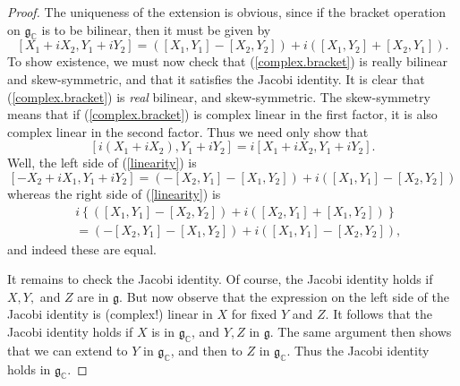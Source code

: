 \documentclass{amsbook}
\let \frak = \mathfrak
\theoremstyle{plain}
\numberwithin{equation}{chapter}
\numberwithin{theorem}{chapter}
\begin{document}
\begin{proof}
The uniqueness of the extension is obvious, since if the bracket operation on
$\frak{g}_{\mathbb{C}}$ is to be bilinear, then it must be given by
\begin{equation}
\left[  X_{1}+iX_{2},Y_{1}+iY_{2}\right]  =\left(  \left[  X_{1},Y_{1}\right]
-\left[  X_{2},Y_{2}\right]  \right)  +i\left(  \left[  X_{1},Y_{2}\right]
+\left[  X_{2},Y_{1}\right]  \right)  \text{.}\label{complex.bracket}%
\end{equation}
To show existence, we must now check that (\ref{complex.bracket}) is really
bilinear and skew-symmetric, and that it satisfies the Jacobi identity. It is
clear that (\ref{complex.bracket}) is \textit{real} bilinear, and
skew-symmetric. The skew-symmetry means that if (\ref{complex.bracket}) is
complex linear in the first factor, it is also complex linear in the second
factor. Thus we need only show that
\begin{equation}
\left[  i(X_{1}+iX_{2}),Y_{1}+iY_{2}\right]  =i\left[  X_{1}+iX_{2}%
,Y_{1}+iY_{2}\right]  \text{.}\label{linearity}%
\end{equation}
Well, the left side of (\ref{linearity}) is
\[
\left[  -X_{2}+iX_{1},Y_{1}+iY_{2}\right]  =\left(  -\left[  X_{2}%
,Y_{1}\right]  -\left[  X_{1},Y_{2}\right]  \right)  +i\left(  \left[
X_{1},Y_{1}\right]  -\left[  X_{2},Y_{2}\right]  \right)
\]
whereas the right side of (\ref{linearity}) is
\begin{align*}
& i\left\{  \left(  \left[  X_{1},Y_{1}\right]  -\left[  X_{2},Y_{2}\right]
\right)  +i\left(  \left[  X_{2},Y_{1}\right]  +\left[  X_{1},Y_{2}\right]
\right)  \right\}  \\
& =\left(  -\left[  X_{2},Y_{1}\right]  -\left[  X_{1},Y_{2}\right]  \right)
+i\left(  \left[  X_{1},Y_{1}\right]  -\left[  X_{2},Y_{2}\right]  \right)
\text{,}%
\end{align*}
and indeed these are equal.

It remains to check the Jacobi identity. Of course, the Jacobi identity holds
if $X,Y,$ and $Z$ are in $\frak{g}$. But now observe that the expression on
the left side of the Jacobi identity is (complex!) linear in $X$ for fixed $Y$
and $Z$. It follows that the Jacobi identity holds if $X$ is in $\frak{g}%
_{\mathbb{C}}$, and $Y,Z$ in $\frak{g}$. The same argument then shows that we
can extend to $Y$ in $\frak{g}_{\mathbb{C}}$, and then to $Z$ in
$\frak{g}_{\mathbb{C}}$. Thus the Jacobi identity holds in $\frak{g}%
_{\mathbb{C}}$.
\end{proof}
\end{document}
